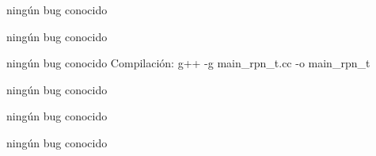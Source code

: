 
\begin{DoxyRefList}
\item[\label{bug__bug000001}%
\Hypertarget{bug__bug000001}%
File \hyperlink{dll__node__t_8h}{dll\+\_\+node\+\_\+t.h} ]ningún bug conocido 
\item[\label{bug__bug000002}%
\Hypertarget{bug__bug000002}%
File \hyperlink{dll__t_8h}{dll\+\_\+t.h} ]ningún bug conocido 
\item[\label{bug__bug000003}%
\Hypertarget{bug__bug000003}%
File \hyperlink{queue__l__t_8h}{queue\+\_\+l\+\_\+t.h} ]ningún bug conocido Compilación\+: g++ -\/g main\+\_\+rpn\+\_\+t.\+cc -\/o main\+\_\+rpn\+\_\+t

ningún bug conocido 
\item[\label{bug__bug000005}%
\Hypertarget{bug__bug000005}%
File \hyperlink{rpn__t_8h}{rpn\+\_\+t.h} ]ningún bug conocido 
\item[\label{bug__bug000006}%
\Hypertarget{bug__bug000006}%
File \hyperlink{stack__l__t_8h}{stack\+\_\+l\+\_\+t.h} ]ningún bug conocido
\end{DoxyRefList}